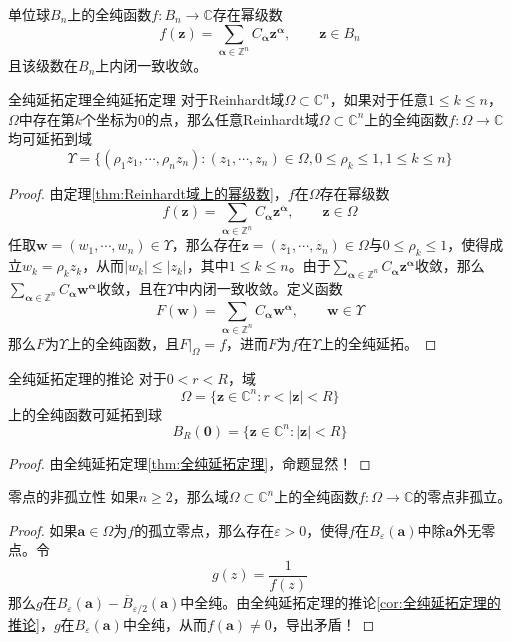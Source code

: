 \documentclass[lang = cn, scheme = chinese, thmcnt = section]{elegantbook}
\newcommand{\C}{\mathbb{C}}  		   %
\newcommand{\Z}{\mathbb{Z}}            %
\newcommand{\sub}{\subset}             %
\newcommand{\bs}{\boldsymbol}          %
\begin{document}
\begin{corollary}
	单位球$B_n$上的全纯函数$f:B_n\to\C$存在幂级数
	$$
	f(\bs{z})
	=\sum_{\bs{\alpha}\in\Z^n}C_{\bs{\alpha}}\bs{z}^{\bs{\alpha}},\qquad \bs{z}\in B_n
	$$
	且该级数在$B_n$上内闭一致收敛。
\end{corollary}

\begin{theorem}{全纯延拓定理}{全纯延拓定理}
	对于Reinhardt域$\Omega\sub\C^n$，如果对于任意$1\le k\le n$，$\Omega$中存在第$k$个坐标为$0$的点，那么任意Reinhardt域$\Omega\sub\C^n$上的全纯函数$f:\Omega\to\C$均可延拓到域
	$$
	\Upsilon=\{ (\rho_1z_1,\cdots,\rho_nz_n):(z_1,\cdots,z_n)\in\Omega,0\le \rho_k \le 1,1\le k \le n \}
	$$
\end{theorem}

\begin{proof}
	由定理\ref{thm:Reinhardt域上的幂级数}，$f$在$\Omega$存在幂级数
	$$
	f(\bs{z})
	=\sum_{\bs{\alpha}\in\Z^n}C_{\bs{\alpha}}\bs{z}^{\bs{\alpha}},\qquad \bs{z}\in\Omega
	$$
	任取$\bs{w}=(w_1,\cdots,w_n)\in\Upsilon$，那么存在$\bs{z}=(z_1,\cdots,z_n)\in\Omega$与$0\le \rho_k \le 1$，使得成立$w_k=\rho_k z_k$，从而$|w_k|\le |z_k|$，其中$1\le k \le n$。由于$\displaystyle \sum_{\bs{\alpha}\in\Z^n}C_{\bs{\alpha}}\bs{z}^{\bs{\alpha}}$收敛，那么$\displaystyle \sum_{\bs{\alpha}\in\Z^n}C_{\bs{\alpha}}\bs{w}^{\bs{\alpha}}$收敛，且在$\Upsilon$中内闭一致收敛。定义函数
	$$
	F(\bs{w})=\sum_{\bs{\alpha}\in\Z^n}C_{\bs{\alpha}}\bs{w}^{\bs{\alpha}},\qquad \bs{w}\in\Upsilon
	$$
	那么$F$为$\Upsilon$上的全纯函数，且$F|_\Omega=f$，进而$F$为$f$在$\Upsilon$上的全纯延拓。
\end{proof}

\begin{corollary}{}{全纯延拓定理的推论}
	对于$0<r<R$，域
	$$
	\Omega=\{ \bs{z}\in\C^n:r<|\bs{z}|<R \}
	$$
	上的全纯函数可延拓到球
	$$
	B_R(\bs{0})=\{ \bs{z}\in\C^n:|\bs{z}|<R \}
	$$
\end{corollary}

\begin{proof}
	由全纯延拓定理\ref{thm:全纯延拓定理}，命题显然！
\end{proof}

\begin{theorem}{}{零点的非孤立性}
	如果$n\ge 2$，那么域$\Omega\sub\C^n$上的全纯函数$f:\Omega\to\C$的零点非孤立。
\end{theorem}

\begin{proof}
	如果$\bs{a}\in\Omega$为$f$的孤立零点，那么存在$\varepsilon>0$，使得$f$在$B_\varepsilon(\bs{a})$中除$\bs{a}$外无零点。令
	$$
	g(z)=\frac{1}{f(z)}
	$$
	那么$g$在$B_\varepsilon(\bs{a})-\overline{B}_{\varepsilon/2}(\bs{a})$中全纯。由全纯延拓定理的推论\ref{cor:全纯延拓定理的推论}，$g$在$B_\varepsilon(\bs{a})$中全纯，从而$f(\bs{a})\ne 0$，导出矛盾！
\end{proof}
\end{document}
